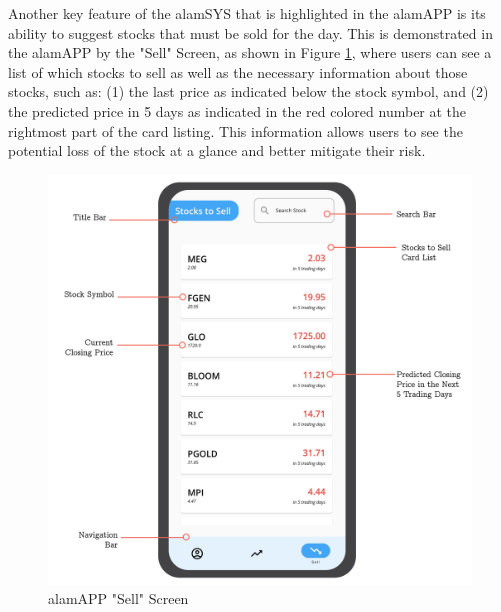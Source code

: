 Another key feature of the alamSYS that is highlighted in the alamAPP is its ability to suggest 
stocks that must be sold for the day. This is demonstrated in the alamAPP by the "Sell" Screen, 
as shown in Figure \ref{fig:alamAPP_sell}, 
where users can see a list of which stocks to sell as well as the 
necessary information about those stocks, such as: (1) the last price as indicated below 
the stock symbol, and (2) the predicted price in 5 days as indicated in the red colored 
number at the rightmost part of the card listing. This information allows users to see the 
potential loss of the stock at a glance and better mitigate their risk.
\begin{figure}[ht]
  \centering
  \includegraphics[height=0.60\textheight]{./assets/Chapter_4/mobile_ui/sell_ui.jpg}
  \caption{alamAPP "Sell" Screen}
  \label{fig:alamAPP_sell}
\end{figure}
\FloatBarrier


